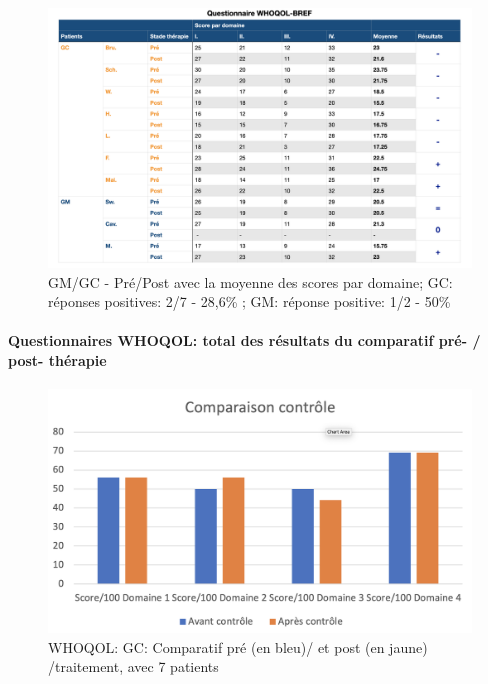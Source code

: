  
 \begin{figure}
 	\centering
 	\includegraphics[width=\linewidth]{images/graphiques/questionnaire_wq.png}
 	\caption[Questionnaire WHOQOL-BREF]{GM/GC - Pré/Post avec la moyenne des scores par 
 		domaine; GC: réponses positives: 2/7 - 28,6\% ; GM: réponse positive: 1/2 - 50\%}
 	
 \end{figure}
 
 
 
 
 
 \paragraph{Questionnaires WHOQOL: total des résultats du 
 	comparatif pré- / post- thé\-ra\-pie}
 
 
 
 \begin{figure} [th]
 	\centering
 	\includegraphics[width=\linewidth]{images/Compcontrole.png}
 	\caption[Schéma du déroulement]{WHOQOL:  GC: Comparatif pré (en bleu)/ et post (en jaune) 
 	/traitement, avec 7 patients}
 	
 \end{figure}
 
